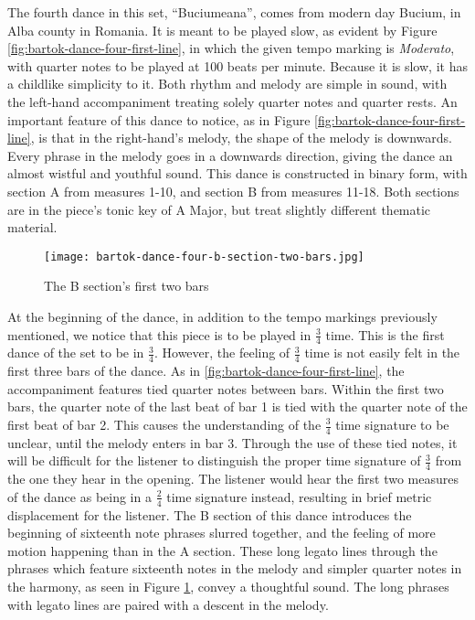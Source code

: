 The fourth dance in this set, ``Buciumeana'', comes from modern day Bucium, in Alba county in Romania. It is meant to be played slow, as evident by Figure \ref{fig:bartok-dance-four-first-line}\autocite{Lung_2016}, in which the given tempo marking is \textit{Moderato}, with quarter notes to be played at 100 beats per minute. Because it is slow, it has a childlike simplicity to it. Both rhythm and melody are simple in sound, with the left-hand accompaniment treating solely quarter notes and quarter rests. An important feature of this dance to notice, as in Figure \ref{fig:bartok-dance-four-first-line}\autocite{Lung_2016}, is that in the right-hand's melody, the shape of the melody is downwards. Every phrase in the melody goes in a downwards direction, giving the dance an almost wistful and youthful sound. This dance is constructed in binary form, with section A from measures 1-10, and section B from measures 11-18. Both sections are in the piece's tonic key of A Major, but treat slightly different thematic material. 

\begin{figure}
  \centering
  \texttt{[image: bartok-dance-four-b-section-two-bars.jpg]}
  \caption[The first two bars of the B section in ``Buciumeana'' of Bartok's \textit{Romanian Folk Dances}, Sz. 56, BB 68]{The B section's first two bars}
  \label{fig:bartok-dance-four-b-section-two-bars}
\end{figure}

At the beginning of the dance, in addition to the tempo markings previously mentioned, we notice that this piece is to be played in $\frac{3}{4}$ time. This is the first dance of the set to be in $\frac{3}{4}$. However, the feeling of $\frac{3}{4}$ time is not easily felt in the first three bars of the dance. As in \ref{fig:bartok-dance-four-first-line}\autocite{Lung_2016}, the accompaniment features tied quarter notes between bars. Within the first two bars, the quarter note of the last beat of bar 1 is tied with the quarter note of the first beat of bar 2. This causes the understanding of the $\frac{3}{4}$ time signature to be unclear, until the melody enters in bar 3. Through the use of these tied notes, it will be difficult for the listener to distinguish the proper time signature of $\frac{3}{4}$ from the one they hear in the opening. The listener would hear the first two measures of the dance as being in a $\frac{2}{4}$ time signature instead, resulting in brief metric displacement for the listener. The B section of this dance introduces the beginning of sixteenth note phrases slurred together, and the feeling of more motion happening than in the A section. These long legato lines through the phrases which feature sixteenth notes in the melody and simpler quarter notes in the harmony, as seen in Figure \ref{fig:bartok-dance-four-b-section-two-bars}\autocite{Lung_2016}, convey a thoughtful sound. The long phrases with legato lines are paired with a descent in the melody. 

